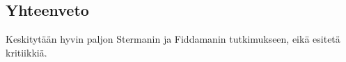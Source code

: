 \documentclass[finnish,12pt,a4paper,pdftex]{article}
\begin{document}
\begin{onehalfspacing}

\section{Yhteenveto \label{yhteenveto}}

Keskitytään hyvin paljon Stermanin ja Fiddamanin tutkimukseen, eikä esitetä kritiikkiä. 

\clearpage
{}
%
%
\printbibliography

\end{onehalfspacing} %
\end{document}
